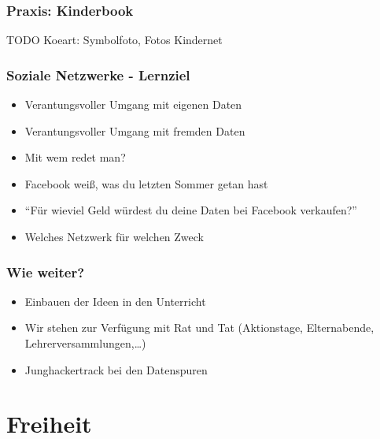 \documentclass{beamer}
\begin{document}
\begin{frame}
  \frametitle{Praxis: Kinderbook}
  TODO Koeart: Symbolfoto, Fotos Kindernet
\end{frame}

\begin{frame}
  \frametitle{Soziale Netzwerke - Lernziel}
  \begin{itemize}
    \item<2-> Verantungsvoller Umgang mit eigenen Daten
    \item<3-> Verantungsvoller Umgang mit fremden Daten
    \item<4-> Mit wem redet man?
    \item<5-> Facebook weiß, was du letzten Sommer getan hast
    \item<6-> "`Für wieviel Geld würdest du deine Daten bei Facebook verkaufen?"'
    \item<7-> Welches Netzwerk für welchen Zweck
  \end{itemize}
\end{frame}

\begin{frame}
  \frametitle{Wie weiter?}
  \begin{itemize}
    \item Einbauen der Ideen in den Unterricht
    \item Wir stehen zur Verfügung mit Rat und Tat (Aktionstage, Elternabende, Lehrerversammlungen,\ldots)
    \item Junghackertrack bei den Datenspuren
  \end{itemize}
\end{frame}

\section{Freiheit}
\subsection{}
\end{document}
